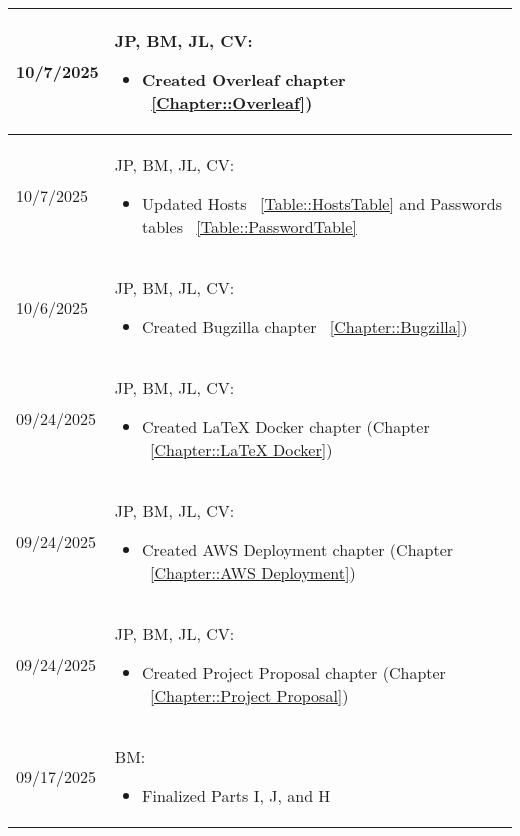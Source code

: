 \begin{longtable}{|l||p{13.5cm}|}
10/7/2025 & JP, BM, JL, CV:
\begin{itemize}[topsep=0pt,itemsep=0pt,parsep=0pt,partopsep=0pt,leftmargin=12pt]
\item Created Overleaf chapter
~\ref{Chapter::Overleaf})
\end{itemize} 
\\ \hline

10/7/2025 & JP, BM, JL, CV:
\begin{itemize}[topsep=0pt,itemsep=0pt,parsep=0pt,partopsep=0pt,leftmargin=12pt]
\item Updated Hosts ~\ref{Table::HostsTable} and Passwords tables
 ~\ref{Table::PasswordTable} 
\end{itemize} 
\\ \hline

10/6/2025 & JP, BM, JL, CV:
\begin{itemize}[topsep=0pt,itemsep=0pt,parsep=0pt,partopsep=0pt,leftmargin=12pt]
\item Created Bugzilla chapter
~\ref{Chapter::Bugzilla})
\end{itemize} 
\\ \hline

09/24/2025 & JP, BM, JL, CV:
\begin{itemize}[topsep=0pt,itemsep=0pt,parsep=0pt,partopsep=0pt,leftmargin=12pt]
\item Created LaTeX Docker chapter (Chapter 
~\ref{Chapter::LaTeX Docker})
\end{itemize} 
\\ \hline

09/24/2025 & JP, BM, JL, CV:
\begin{itemize}[topsep=0pt,itemsep=0pt,parsep=0pt,partopsep=0pt,leftmargin=12pt]
\item Created AWS Deployment chapter (Chapter 
~\ref{Chapter::AWS Deployment})
\end{itemize} 
\\ \hline

09/24/2025 & JP, BM, JL, CV:
\begin{itemize}[topsep=0pt,itemsep=0pt,parsep=0pt,partopsep=0pt,leftmargin=12pt]
\item Created Project Proposal chapter (Chapter 
~\ref{Chapter::Project Proposal})
\end{itemize} 
\\ \hline

09/17/2025 & BM:
\begin{itemize}[topsep=0pt,itemsep=0pt,parsep=0pt,partopsep=0pt,leftmargin=12pt]
\item Finalized Parts I, J, and H


\end{itemize}
\end{longtable}
